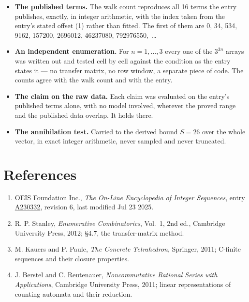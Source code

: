 \documentclass[11pt]{article}
\theoremstyle{definition}
\begin{document}
\begin{itemize}

\item {\bfseries The published terms.} The walk count reproduces all 16 terms the entry publishes, exactly, in integer arithmetic, with the index taken from the entry's stated offset (1) rather than fitted. The first of them are 0, 34, 534, 9162, 157200, 2696012, 46237080, 792976550,~\dots

\item {\bfseries An independent enumeration.} For $n = 1,\dots,3$ every one of the $3^{3n}$ arrays was written out and tested cell by cell against the condition as the entry states it --- no transfer matrix, no row window, a separate piece of code. The counts agree with the walk count and with the entry.

\item {\bfseries The claim on the raw data.} Each claim was evaluated on the entry's published terms alone, with no model involved, wherever the proved range and the published data overlap. It holds there.

\item {\bfseries The annihilation test.} Carried to the derived bound $S = 26$ over the whole vector, in exact integer arithmetic, never sampled and never truncated.

\end{itemize}

\section{References}

\begin{enumerate}

\item OEIS Foundation Inc., \emph{The On-Line Encyclopedia of Integer Sequences}, entry \href{https://oeis.org/A230332}{A230332}, revision 6, last modified Jul 23 2025.

\item R. P. Stanley, \emph{Enumerative Combinatorics}, Vol.~1, 2nd ed., Cambridge University Press, 2012; \S4.7, the transfer-matrix method.

\item M. Kauers and P. Paule, \emph{The Concrete Tetrahedron}, Springer, 2011; C-finite sequences and their closure properties.

\item J. Berstel and C. Reutenauer, \emph{Noncommutative Rational Series with Applications}, Cambridge University Press, 2011; linear representations of counting automata and their reduction.

\end{enumerate}
\end{document}

